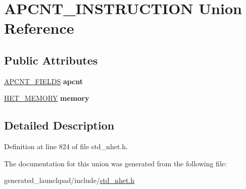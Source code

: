 \hypertarget{unionAPCNT__INSTRUCTION}{}\section{A\+P\+C\+N\+T\+\_\+\+I\+N\+S\+T\+R\+U\+C\+T\+I\+ON Union Reference}
\label{unionAPCNT__INSTRUCTION}
\subsection*{Public Attributes}
\begin{DoxyCompactItemize}
\item 
\mbox{\label{unionAPCNT__INSTRUCTION_aa2df4b1ec94004a8764df54b9d2f17ef}} 
\mbox{\hyperlink{structapcnt__format}{A\+P\+C\+N\+T\+\_\+\+F\+I\+E\+L\+DS}} {\bfseries apcnt}
\item 
\mbox{\label{unionAPCNT__INSTRUCTION_a432be48de256be8afd6509b343632752}} 
\mbox{\hyperlink{structmemory__format}{H\+E\+T\+\_\+\+M\+E\+M\+O\+RY}} {\bfseries memory}
\end{DoxyCompactItemize}


\subsection{Detailed Description}


Definition at line 824 of file std\+\_\+nhet.\+h.



The documentation for this union was generated from the following file\+:\begin{DoxyCompactItemize}
\item 
generated\+\_\+launchpad/include/\mbox{\hyperlink{std__nhet_8h}{std\+\_\+nhet.\+h}}\end{DoxyCompactItemize}
